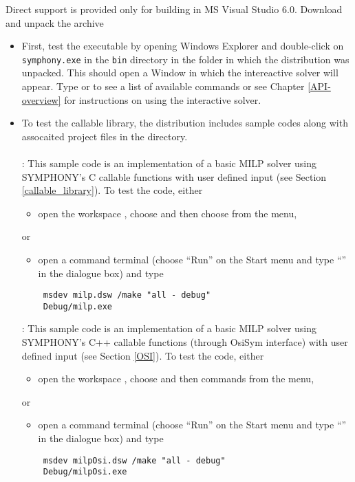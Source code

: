 Direct support is provided only for building in MS Visual Studio 6.0. 
Download and unpack the archive  
\begin{itemize}
\item First, test the executable by opening Windows Explorer and double-click
on {\color{Brown}\texttt{symphony.exe}} in the {\color{Brown}\texttt{bin}}
directory in the folder in which the distribution was unpacked. This should
open a Window in which the intereactive solver will appear. Type 
or  to see a list of available commands or see Chapter
\ref{API-overview} for instructions on using the interactive solver.

\item To test the callable library, the distribution includes sample codes
along with assocaited project files in the  directory. \\ \\
: This sample code is an implementation of a basic MILP
solver using SYMPHONY's C callable functions with user defined input (see
Section \ref{callable_library}). To test the code, either

\begin{itemize}
\item open the workspace , choose 
and then choose  from the  menu, 
\end{itemize}
or
\begin{itemize}
\item open a command terminal (choose ``Run'' on the Start menu and type
``'' in the dialogue box) and type 
{\color{Brown}
\begin{verbatim}
 msdev milp.dsw /make "all - debug"
 Debug/milp.exe
 \end{verbatim}
}
\end{itemize}
: This sample code is an implementation of a basic MILP 
solver using SYMPHONY's C++ callable functions (through OsiSym interface)
with user defined input (see Section \ref{OSI}). To test the code, either 
\begin{itemize}
\item open the workspace , 
choose  and then 
 commands from the  menu, 
\end{itemize}
or
\begin{itemize}
\item open a command terminal (choose ``Run'' on the Start menu and type
``'' in the dialogue box) and type 
{\color{Brown}
\begin{verbatim}
 msdev milpOsi.dsw /make "all - debug"
 Debug/milpOsi.exe
 \end{verbatim}
}
\end{itemize}
\end{itemize}

